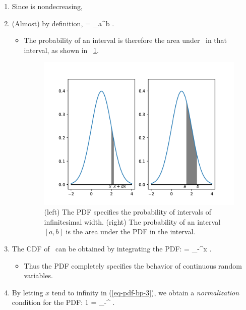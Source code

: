 	\renewcommand{\labelenumi}{(\roman{enumi})}
	\renewcommand{\theenumi}{(\roman{enumi})}
	\begin{enumerate}
		\item Since  is nondecreasing,
			 
		\eeql

		\item (Almost) by definition,
			 = \int_a^b  \dx.
		\eeql
		\begin{itemize}
			\item The probability of an interval is
			therefore the area under \ in that interval,
			as shown in \figurename~\ref{fig-lg-4-4}.
			
			\begin{figure}\begin{center}
			\includegraphics[width=.8\linewidth]{figures/fig4_4}
			\caption{
			(left) The PDF specifies the probability of intervals of
			infinitesimal width.
			(right) The probability of an interval $[a,b]$
			is the area under the PDF in the interval.
			}
			\label{fig-lg-4-4}
			\end{center}\end{figure}
		\end{itemize}

		\item The CDF of \X\ can be obtained by integrating the PDF:
			 = \int_{-\infty}^x   \dt.
		\eeql
		\begin{itemize}
			\item Thus the PDF
			completely specifies the behavior of continuous random variables.
		\end{itemize}

		\item By letting $x$ tend to infinity in (\ref{eq-pdf-bp-3}),
		we obtain a \emph{normalization} condition for the PDF:
			1 = \int_{-\infty}^\infty {} \dx.
		\eeql

		
	\end{enumerate}
	\renewcommand{\labelenumi}{\arabic{enumi}.}
	\renewcommand{\theenumi}{\arabic{enumi}.}

